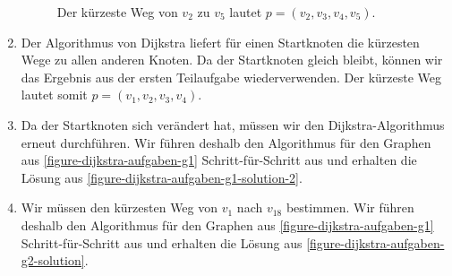 \begin{enumerate}
\begin{figure}[htb]
\begin{minipage}{0.45\textwidth}
	\caption{Der kürzeste Weg von $v_2$ zu $v_5$ lautet $p = (v_2, v_3, v_4, v_5).$}
	\label{figure-dijkstra-aufgaben-g1-solution-2}
\end{minipage}
\end{figure}

	\item Der Algorithmus von Dijkstra liefert für einen Startknoten die kürzesten Wege zu allen anderen Knoten. Da der Startknoten gleich bleibt, können wir das Ergebnis aus der ersten Teilaufgabe wiederverwenden. Der kürzeste Weg lautet somit $p = (v_1, v_2, v_3,v _4)$.

	\item Da der Startknoten sich verändert hat, müssen wir den Dijkstra-Algorithmus erneut durchführen. Wir führen deshalb den Algorithmus für den Graphen aus \autoref{figure-dijkstra-aufgaben-g1} Schritt-für-Schritt aus und erhalten die Lösung aus \autoref{figure-dijkstra-aufgaben-g1-solution-2}.

\item Wir müssen den kürzesten Weg von $v_1$ nach $v_18$ bestimmen. Wir führen deshalb den Algorithmus für den Graphen aus \autoref{figure-dijkstra-aufgaben-g1} Schritt-für-Schritt aus und erhalten die Lösung aus \autoref{figure-dijkstra-aufgaben-g2-solution}.


\end{enumerate}
